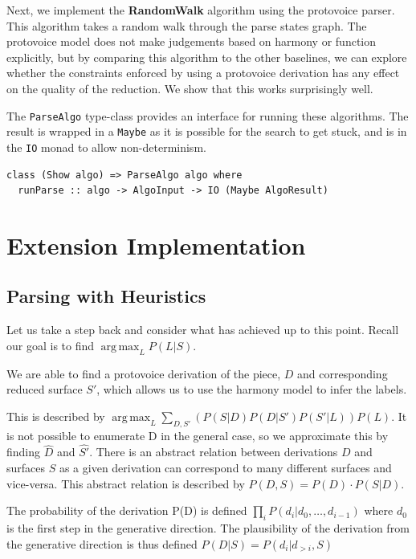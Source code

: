 \documentclass[12pt,a4paper,twoside,openright]{report}
\DeclareMathOperator*{\argmax}{arg\,max}
\theoremstyle{definition}
\begin{document}
Next, we implement the \textbf{RandomWalk} algorithm using the protovoice parser. This algorithm takes a random walk through the parse states graph. The protovoice model does not make judgements based on harmony or function explicitly, but by comparing this algorithm to the other baselines, we can explore whether the constraints enforced by using a protovoice derivation has any effect on the quality of the reduction. We show that this works surprisingly well.

The \texttt{ParseAlgo} type-class provides an interface for running these algorithms. The result is wrapped in a \texttt{Maybe} as it is possible for the search to get stuck, and is in the \texttt{IO} monad to allow non-determinism.

\begin{lstlisting}[caption={Algorithm type-class}, captionpos=b]
class (Show algo) => ParseAlgo algo where 
  runParse :: algo -> AlgoInput -> IO (Maybe AlgoResult)
\end{lstlisting}

\section{Extension Implementation}

\subsection{Parsing with Heuristics}
Let us take a step back and consider what has achieved up to this point. Recall our goal is to find $\argmax_L P(L|S)$. 

We are able to find a protovoice derivation of the piece, $D$ and corresponding reduced surface $S'$, which allows us to use the harmony model to infer the labels. 

This is described by $\argmax_L \sum\limits_{D,S'}(P(S|D)P(D|S')P(S'|L)) P(L)$. 
It is not possible to enumerate D in the general case, so we approximate this by finding $\hat{D}$ and $\hat{S'}$. 
There is an abstract relation between derivations $D$ and surfaces $S$ as a given derivation can correspond to many different surfaces and vice-versa. 
This abstract relation is described by $P(D, S) = P(D)\cdot P(S|D)$. 

The probability of the derivation P(D) is defined $\prod_i P(d_i | d_0, \dots, d_{i-1})$ where $d_0$ is the first step in the generative direction. 
The plausibility of the derivation from the generative direction is thus defined $P(D|S) = P(d_i|d_{>i}, S)$  
\end{document}
